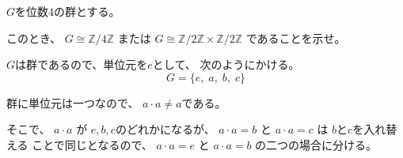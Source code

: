 \documentclass[12pt,b5paper]{ltjsarticle}
\begin{document}
\hrulefill

$G$を位数$4$の群とする。

このとき、
$G \cong \mathbb{Z}/4\mathbb{Z}$
または
$G \cong \mathbb{Z}/2\mathbb{Z} \times \mathbb{Z}/2\mathbb{Z}$
であることを示せ。

\dotfill

$G$は群であるので、単位元を$e$として、
次のようにかける。
\begin{equation}
 G=\{ e,\; a,\; b,\; c\}
\end{equation}

群に単位元は一つなので、
$a\cdot a \ne a$である。

そこで、
$a\cdot a$ が
$e,b,c$のどれかになるが、
$a\cdot a=b$ と
$a\cdot a=c$ は
$b$と$c$を入れ替える
ことで同じとなるので、
$a\cdot a=e$ と $a\cdot a=b$
の二つの場合に分ける。
\end{document}
